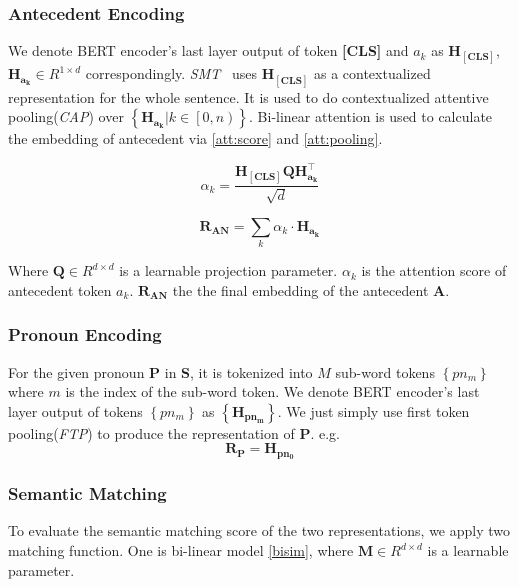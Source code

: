 \documentclass[11pt,a4paper]{article}
\newcommand{\smt}{\textit{SMT}}
\begin{document}
\subsubsection{Antecedent Encoding}
We denote BERT\cite{devlin2018bert} encoder's last layer output of token \textbf{[CLS]} and $a_k$ as $\mathbf{H_{[CLS]}}$,$\mathbf{H_{a_k}} \in R^{1 \times d}$ correspondingly.
\smt~ uses $\mathbf{H_{[CLS]}}$ as a contextualized representation for the whole sentence. It is used to do contextualized attentive pooling(\textit{CAP}) over $\left\{ \mathbf{H_{a_k}} \vert k \in \left[0,n\right) \right\}$. Bi-linear attention is used to calculate the embedding of antecedent via \eqref{att:score} and \eqref{att:pooling}. 

\begin{equation}
    \alpha_k=\frac{{\mathbf{H_{[CLS]}}  \mathbf{Q} \mathbf{ H^{\intercal}_{a_k}} }}{\sqrt{d}}
    \label{att:score}
\end{equation}

\begin{equation}
    \mathbf{R_{AN}}=\sum_k\alpha_k \cdot \mathbf{ H_{a_k}}
    \label{att:pooling}
\end{equation}

Where $\mathbf{Q}\in R^{d  \times d}$ is a learnable projection parameter. $\alpha_k$ is the attention score of antecedent token $a_k$. $\mathbf{R_{AN}}$ the the final embedding of the antecedent $\mathbf{A}$.

\subsubsection{Pronoun Encoding}
For the given pronoun $\mathbf{P}$ in $\mathbf{S}$, it is tokenized into $M$ sub-word tokens $\left\{pn_m\right\}$ where $m$ is the index of the sub-word token. We denote BERT\cite{devlin2018bert} encoder's last layer output of tokens $\left\{pn_m\right\}$ as $\left\{ \mathbf{H_{pn_m}} \right\}$. We just simply use first token pooling(\textit{FTP}) to produce the representation of $\mathbf{P}$. e.g. 
\begin{equation}
    \mathbf{R_P}=\mathbf{H_{pn_0}}
\end{equation}

\subsubsection{Semantic Matching}
To evaluate the semantic matching score of the two representations, we apply two matching function. One is bi-linear model \eqref{bisim}, where $\mathbf{M} \in R^{d \times d}$ is a learnable parameter. 
\end{document}
